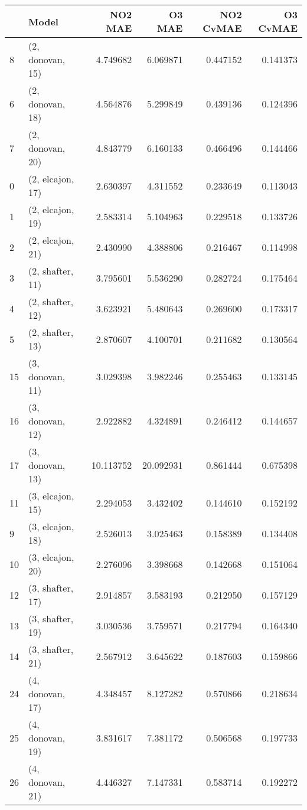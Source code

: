 \begin{tabular}{llrrrr}
\toprule
{} &             Model &    NO2 MAE &     O3 MAE &  NO2 CvMAE &  O3 CvMAE \\
\midrule
8  &  (2, donovan, 15) &   4.749682 &   6.069871 &   0.447152 &  0.141373 \\
6  &  (2, donovan, 18) &   4.564876 &   5.299849 &   0.439136 &  0.124396 \\
7  &  (2, donovan, 20) &   4.843779 &   6.160133 &   0.466496 &  0.144466 \\
0  &  (2, elcajon, 17) &   2.630397 &   4.311552 &   0.233649 &  0.113043 \\
1  &  (2, elcajon, 19) &   2.583314 &   5.104963 &   0.229518 &  0.133726 \\
2  &  (2, elcajon, 21) &   2.430990 &   4.388806 &   0.216467 &  0.114998 \\
3  &  (2, shafter, 11) &   3.795601 &   5.536290 &   0.282724 &  0.175464 \\
4  &  (2, shafter, 12) &   3.623921 &   5.480643 &   0.269600 &  0.173317 \\
5  &  (2, shafter, 13) &   2.870607 &   4.100701 &   0.211682 &  0.130564 \\
15 &  (3, donovan, 11) &   3.029398 &   3.982246 &   0.255463 &  0.133145 \\
16 &  (3, donovan, 12) &   2.922882 &   4.324891 &   0.246412 &  0.144657 \\
17 &  (3, donovan, 13) &  10.113752 &  20.092931 &   0.861444 &  0.675398 \\
11 &  (3, elcajon, 15) &   2.294053 &   3.432402 &   0.144610 &  0.152192 \\
9  &  (3, elcajon, 18) &   2.526013 &   3.025463 &   0.158389 &  0.134408 \\
10 &  (3, elcajon, 20) &   2.276096 &   3.398668 &   0.142668 &  0.151064 \\
12 &  (3, shafter, 17) &   2.914857 &   3.583193 &   0.212950 &  0.157129 \\
13 &  (3, shafter, 19) &   3.030536 &   3.759571 &   0.217794 &  0.164340 \\
14 &  (3, shafter, 21) &   2.567912 &   3.645622 &   0.187603 &  0.159866 \\
24 &  (4, donovan, 17) &   4.348457 &   8.127282 &   0.570866 &  0.218634 \\
25 &  (4, donovan, 19) &   3.831617 &   7.381172 &   0.506568 &  0.197733 \\
26 &  (4, donovan, 21) &   4.446327 &   7.147331 &   0.583714 &  0.192272 \\

\end{tabular}
